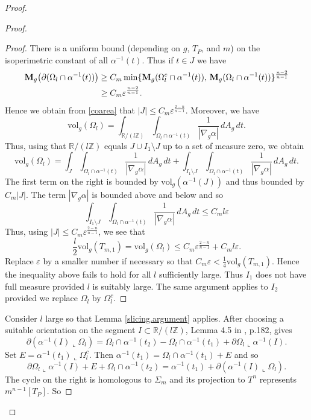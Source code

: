 \documentclass[11pt]{amsart}
\def\R{\mathbb R}
\def\Z{\mathbb Z}
\def\vol{\mathrm{vol}}
\theoremstyle{remark}
\theoremstyle{definition}
\begin{document}
\begin{proof}
\begin{proof}
\begin{proof}
				There is a uniform bound (depending on $g$, $T_P$, and $m$) on the isoperimetric constant of all $\alpha^{-1}(t)$. Thus if  $t\in J$ we have
				{\begin{align*}
						{\bf M}_g\bigl(\partial(\Omega_l\cap\alpha^{-1}(t))\bigr)& \geq C_m\min\{{\bf M}_g(\Omega_l^c\cap\alpha^{-1}(t)),\,{\bf M}_g(\Omega_l\cap\alpha^{-1}(t))
						\}^{\frac{n-2}{n-1}}\\
						&\geq C_m\varepsilon^{\frac{n-2}{n-1}}.
				\end{align*}}
				Hence we obtain from \eqref{coarea} that $|J|\leq C_m\varepsilon^{\frac{2-n}{n-1}}$. Moreover, we have
				$$
				\vol_g(\Omega_l)=\int_{\R/(l\Z)}\int_{\Omega_l\cap\alpha^{-1}(t)}\frac{1}{|\nabla_g\alpha|}\,dA_g\,dt.
				$$
				Thus, using  that $\R/(l\Z)$ equals $J\cup I_1\setminus J$ up to a set of measure zero, we obtain
				$$
				\vol_g(\Omega_l){=} \int_{J}\int_{\Omega_l\cap\alpha^{-1}(t)}\frac{1}{|\nabla_g\alpha|}\,dA_g\,dt+\int_{I_1\setminus J}\int_{\Omega_l\cap\alpha^{-1}(t)}\frac{1}{|\nabla_g\alpha|}\,dA_g\,dt.
				$$
				The first term on the right is bounded by $\vol_g(\alpha^{-1}(J))$ and  thus bounded by $C_m|J|$. The term $|\nabla_g\alpha|$ is bounded above and below and so
				$$\int_{I_1\setminus J}\int_{\Omega_l\cap\alpha^{-1}(t)}\frac{1}{|\nabla_g\alpha|}\,dA_g\,dt\leq C_m l\varepsilon  $$
				Thus, {using $|J|\leq C_m\varepsilon^{\frac{2-n}{n-1}}$}, we see that
				$$\frac{l}{2}\vol_g(T_{m,1})=\vol_g(\Omega_l)\leq C_m\varepsilon^{\frac{2-n}{n-1}}+C_m l\varepsilon.$$
				Replace $\varepsilon$ by a smaller number if necessary so that $C_m \varepsilon<\frac 14 \vol_g(T_{m,1})$. Hence the inequality above fails to hold for all $l$ sufficiently large. Thus $I_1$ does not have full measure provided  $l$ is suitably large. The same argument applies to $I_2$ provided we replace $\Omega_l$ by $\Omega_l^c$.
			\end{proof}
			Consider $l$ large so that Lemma \ref{slicing.argument} applies. After choosing a suitable orientation on the segment $I\subset \R/(l\Z)$, Lemma 4.5 in \cite{leon}, p.182, gives
			$$
			\partial(\alpha^{-1}(I)\llcorner \Omega_l)=\Omega_l\cap\alpha^{-1}(t_2)-\Omega_l\cap\alpha^{-1}(t_1)+\partial \Omega_l\llcorner \alpha^{-1}(I).
			$$
			Set $E=\alpha^{-1}(t_1)\llcorner \Omega_l^c$.  Then $\alpha^{-1}(t_1)=\Omega_l\cap\alpha^{-1}(t_1)+E$ and so
			$$
			\partial \Omega_l\llcorner \alpha^{-1}(I)+E+\Omega_l\cap\alpha^{-1}(t_2)=\alpha^{-1}(t_1)+\partial(\alpha^{-1}(I)\llcorner \Omega_l).
			$$
			The cycle on the right is homologous to $\Sigma_m$ and its projection to $T^n$ represents $m^{n-1}[T_P]$.  So 

\end{proof}
\end{proof}
\end{document}
